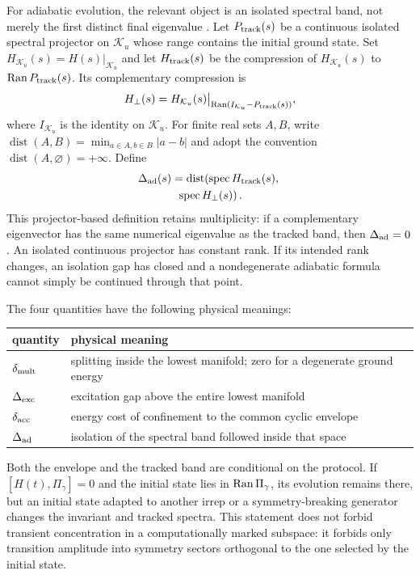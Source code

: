 For adiabatic evolution, the relevant object is an isolated spectral band,
not merely the first distinct final eigenvalue
\cite{JansenRuskaiSeiler2007}.  Let
$P_{\rm track}(s)$ be a continuous isolated spectral projector on
$\mathcal K_u$ whose range contains the initial ground state.  Set
$H_{\mathcal K_u}(s)=H(s)|_{\mathcal K_u}$ and let
$H_{\rm track}(s)$ be the compression of $H_{\mathcal K_u}(s)$ to
$\operatorname{Ran} P_{\rm track}(s)$.  Its complementary compression is
\begin{equation}
 H_\perp(s)=H_{\mathcal K_u}(s)
 \big|_{\operatorname{Ran}(I_{\mathcal K_u}-P_{\rm track}(s))},
\end{equation}
where $I_{\mathcal K_u}$ is the identity on $\mathcal K_u$.  For finite
real sets $A,B$, write
$\operatorname{dist}(A,B)=\min_{a\in A,b\in B}|a-b|$ and adopt the
convention $\operatorname{dist}(A,\varnothing)=+\infty$.  Define
\begin{multline}
 \Delta_{\rm ad}(s)=\operatorname{dist}\!\left(
 \operatorname{spec} H_{\rm track}(s),\right.\\
 \left.\operatorname{spec} H_\perp(s)\right).
 \label{eq:adiabatic-gap-rewrite}
\end{multline}
This projector-based definition retains multiplicity: if a complementary
eigenvector has the same numerical eigenvalue as the tracked band, then
$\Delta_{\rm ad}=0$.
An isolated continuous projector has constant rank.  If its intended rank
changes, an isolation gap has closed and a nondegenerate adiabatic formula
cannot simply be continued through that point.

The four quantities have the following physical meanings:
\begin{center}
\centering
\small
\begin{tabular}{lp{}}
\hline
quantity & physical meaning\\
\hline
$\delta_{\rm mult}$ & splitting inside the lowest manifold; zero for a
degenerate ground energy\\
$\Delta_{\rm exc}$ & excitation gap above the entire lowest manifold\\
$\delta_{\rm acc}$ & energy cost of confinement to the common cyclic
envelope\\
$\Delta_{\rm ad}$ & isolation of the spectral band followed inside that
space\\
\hline
\end{tabular}
\end{center}

Both the envelope and the tracked band are conditional on the protocol.  If
$[H(t),\Pi_\gamma]=0$ and the initial state lies in $\operatorname{Ran}\Pi_\gamma$, its
evolution remains there, but an initial state adapted to another irrep or a
symmetry-breaking generator changes the invariant and tracked spectra.  This statement
does not forbid transient concentration in a computationally marked
subspace: it forbids only transition amplitude into symmetry sectors
orthogonal to the one selected by the initial state.
